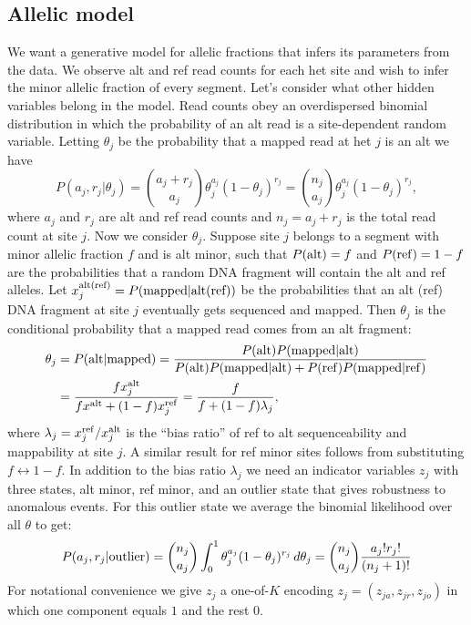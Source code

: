 \documentclass[nofootinbib,amssymb,amsmath]{revtex4}
\begin{document}
\subsection{Allelic model} \label{allelic-model}
We want a generative model for allelic fractions that infers its parameters from the data.  We observe alt and ref read counts for each het site and wish to infer the minor allelic fraction of every segment.  Let's consider what other hidden variables belong in the model.  Read counts obey an overdispersed binomial distribution in which the probability of an alt read is a site-dependent random variable.  Letting $\theta_j$ be the probability that a mapped read at het $j$ is an alt we have
%
\begin{equation}
P(a_j, r_j | \theta_j) =  \binom{a_j + r_j}{a_j} \theta_j^{a_j} (1-\theta_j)^{r_j} = \binom{n_j}{a_j} \theta_j^{a_j} (1-\theta_j)^{r_j},
\end{equation}
where $a_j$ and $r_j$ are alt and ref read counts and $n_j = a_j + r_j$ is the total read count at site $j$.  Now we consider $\theta_j$.  Suppose site $j$ belongs to a segment with minor allelic fraction $f$ and is alt minor, such that $P({\rm alt}) = f$ and $P({\rm ref}) = 1 - f$ are the probabilities that a random DNA fragment will contain the alt and ref alleles.  Let $x^{\rm alt (ref)}_j = P({\rm mapped} | {\rm alt (ref)})$ be the probabilities that an alt (ref) DNA fragment at site $j$ eventually gets sequenced and mapped.  Then $\theta_j$ is the conditional probability that a mapped read comes from an alt fragment:
%
\begin{align}
\theta_j  &= P( {\rm alt} | {\rm mapped} ) = \frac { P( {\rm alt} ) P( {\rm mapped} | {\rm alt} ) } { P( {\rm alt} ) P( {\rm mapped} | {\rm alt} ) + P( {\rm ref} ) P( {\rm mapped} | {\rm ref} ) } \\
 &= \frac{f x^{\rm alt}_j }{fx^{\rm alt} + (1-f) x^{\rm ref}_j } = \frac{f}{f + (1-f) \lambda_j},
\end{align}
%
where $\lambda_j = x^{\rm ref}_j / x^{\rm alt}_j$ is the ``bias ratio'' of ref to alt sequenceability and mappability at site $j$.  A similar result for ref minor sites follows from substituting $f \leftrightarrow 1 - f$.  In addition to the bias ratio $\lambda_j$ we need an indicator variables $z_j$ with three states, alt minor, ref minor, and an outlier state that gives robustness to anomalous events.  For this outlier state we average the binomial likelihood over all $\theta$ to get:
%
\begin{align}
P(a_j, r_j | {\rm outlier}) = \binom{n_j}{a_j} \int_0^1 \theta_j^{a_j} (1-\theta_j)^{r_j} \, d \theta_j 
= \binom{n_j}{a_j} \frac{a_j! r_j!}{(n_j + 1)!}
\end{align}
%
For notational convenience we give $z_j$ a one-of-$K$ encoding $z_j = (z_{ja}, z_{jr}, z_{jo})$ in which one component equals $1$ and the rest $0$.
\end{document}
